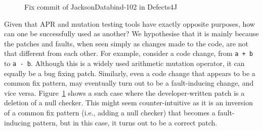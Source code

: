 \documentclass[conference]{IEEEtran}
\def\d4j{Defects4J\xspace}
\begin{document}

\begin{figure}[!ht]
    \centering
    \inputminted[escapeinside=||,linenos,breaklines,breakanywhere]{diff}{figures/diff/JacksonDatabind_102.diff}
    \caption{Fix commit of JacksonDatabind-102 in \d4j}
    \label{fig:intro_null_checker_example}
\end{figure}

Given that APR and mutation testing tools have exactly opposite purposes, how
can one be successfully used as another? We hypothesise that it is mainly
because the patches and faults, when seen simply as changes made to the code,
are not that different from each other. For example, consider a code change,
from \texttt{a + b} to \texttt{a - b}. Although this is a widely used arithmetic
mutation operator, it can equally be a bug fixing patch. Similarly, even a code
change that appears to be a common fix pattern, may eventually turn out to be a
fault-inducing change, and vice versa.
Figure~\ref{fig:intro_null_checker_example} shows a such case where the
developer-written patch is a deletion of a null checker. This might seem
counter-intuitive as it is an inversion of a common fix pattern (i.e., adding a
null checker) that becomes a fault-inducing pattern, but in this case, it turns
out to be a correct patch.








\end{document}
